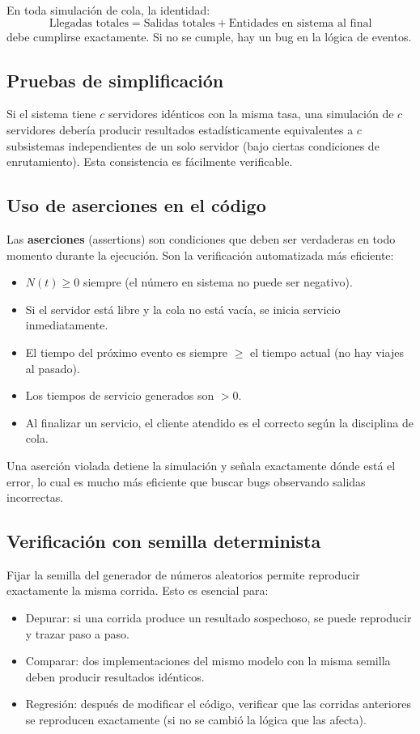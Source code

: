 \documentclass[11pt, letterpaper]{article}
\begin{document}
En toda simulación de cola, la identidad:
\[
\text{Llegadas totales} = \text{Salidas totales} + \text{Entidades en sistema al final}
\]
debe cumplirse exactamente. Si no se cumple, hay un bug en la lógica de eventos.

\subsection{Pruebas de simplificación}

Si el sistema tiene $c$ servidores idénticos con la misma tasa, una simulación de $c$ servidores debería producir resultados estadísticamente equivalentes a $c$ subsistemas independientes de un solo servidor (bajo ciertas condiciones de enrutamiento). Esta consistencia es fácilmente verificable.

\subsection{Uso de aserciones en el código}

Las \textbf{aserciones} (assertions) son condiciones que deben ser verdaderas en todo momento durante la ejecución. Son la verificación automatizada más eficiente:

\begin{itemize}
    \item $N(t) \ge 0$ siempre (el número en sistema no puede ser negativo).
    \item Si el servidor está libre y la cola no está vacía, se inicia servicio inmediatamente.
    \item El tiempo del próximo evento es siempre $\ge$ el tiempo actual (no hay viajes al pasado).
    \item Los tiempos de servicio generados son $> 0$.
    \item Al finalizar un servicio, el cliente atendido es el correcto según la disciplina de cola.
\end{itemize}

Una aserción violada detiene la simulación y señala exactamente dónde está el error, lo cual es mucho más eficiente que buscar bugs observando salidas incorrectas.

\subsection{Verificación con semilla determinista}

Fijar la semilla del generador de números aleatorios permite reproducir exactamente la misma corrida. Esto es esencial para:
\begin{itemize}
    \item Depurar: si una corrida produce un resultado sospechoso, se puede reproducir y trazar paso a paso.
    \item Comparar: dos implementaciones del mismo modelo con la misma semilla deben producir resultados idénticos.
    \item Regresión: después de modificar el código, verificar que las corridas anteriores se reproducen exactamente (si no se cambió la lógica que las afecta).
\end{itemize}
\end{document}
